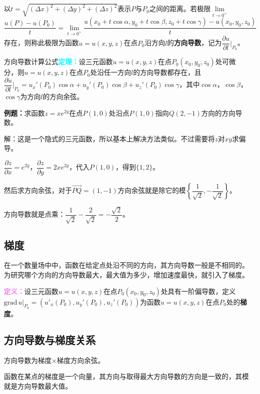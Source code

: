 \documentclass[UTF8, 12pt]{ctexart}
\begin{document}
        以$t=\sqrt{(\Delta x)^2+(\Delta y)^2+(\Delta z)^2}$表示$P$与$P_0$之间的距离。若极限$\lim\limits_{t\to0^+}$\\$\dfrac{u(P)-u(P_0)}{t}=\lim\limits_{t\to0^+}\dfrac{u(x_0+t\cos\alpha,y_0+t\cos\beta,z_0+t\cos\gamma)-u(x_0,y_0,z_0)}{t}$存在，则称此极限为函数$u=u(x,y,z)$在点$P_0$沿方向$l$的\textbf{方向导数}，记为$\dfrac{\partial u}{\partial l}\bigg|_{P_0}$。

        方向导数计算公式\textcolor{aqua}{\textbf{定理：}}设三元函数$u=u(x,y,z)$在点$P_0(x_0,y_0,z_0)$处可微分，则$u=u(x,y,z)$在点$P_0$处沿任一方向$l$的方向导数都存在，且$\dfrac{\partial u}{\partial l}\bigg|_{P_0}=u_x'(P_0)\cos\alpha+u_y'(P_0)\cos\beta+u_z'(P_0)\cos\gamma$，其中$\cos\alpha$，$\cos\beta$，$\cos\gamma$为方向$l$的方向余弦。

        \textbf{例题：}求函数$z=xe^{2y}$在点$P(1,0)$处沿点$P(1,0)$指向$Q(2,-1)$方向的方向导数。

        解：这是一个隐式的三元函数，所以基本上解决方法类似。不过需要将$z$对$xy$求偏导。

        $\dfrac{\partial z}{\partial x}=e^{2y}$，$\dfrac{\partial z}{\partial y}=2xe^{2y}$，代入$P(1,0)$，得到$\{1,2\}$。

        然后求方向余弦，对于$\overrightarrow{PQ}=(1,-1)$方向余弦就是除它的模$\left\{\dfrac{1}{\sqrt{2}},-\dfrac{1}{\sqrt{2}}\right\}$。

        方向导数就是点乘：$\dfrac{1}{\sqrt{2}}-\dfrac{2}{\sqrt{2}}=-\dfrac{\sqrt{2}}{2}$。

        \subsection{梯度}

        在一个数量场中中，函数在给定点处沿不同的方向，其方向导数一般是不相同的。为研究哪个方向的方向导数最大，最大值为多少，增加速度最快，就引入了梯度。

        \textcolor{violet}{\textbf{定义：}}设三元函数$u=u(x,y,z)$在点$P_0(x_0,y_0,z_0)$处具有一阶偏导数，定义$\text{grad}\,u|_{P_0}=(u'_x(P_0),u_y'(P_0),u_z'(P_0))$为函数$u=u(x,y,z)$在点$P_0$处的\textbf{梯度}。

        \subsection{方向导数与梯度关系}

        方向导数为梯度×梯度方向余弦。

        函数在某点的梯度是一个向量，其方向与取得最大方向导数的方向是一致的，其模就是方向导数最大值。
\end{document}
